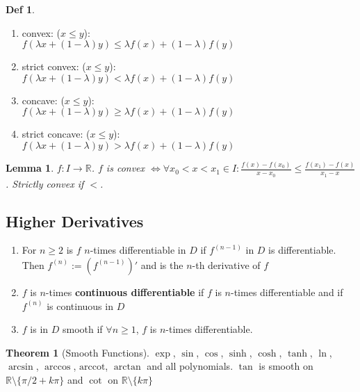 \documentclass[a4paper, 10pt]{article}
\newtheorem*{lemma}{Lemma}
\theoremstyle{definition}
\newtheorem*{definition}{Def}
\theoremstyle{named}
\newtheorem*{ntheorem_wrapper}{Theorem}
\newenvironment{ntheorem}%
    {\begin{mdframed}[style=important]\begin{ntheorem_wrapper}}%
    {\end{ntheorem_wrapper}\end{mdframed}}
\newcommand{\R}{\mathbb{R}}
\begin{document}
\begin{definition}
    \begin{enumerate}
        \item convex: ($x \leq y$): \\
            $f (\lambda x + (1 - \lambda)y) \leq \lambda f(x) + (1 - \lambda)f(y)$
        \item strict convex: ($x \leq y$): \\
            $f (\lambda x + (1 - \lambda)y) < \lambda f(x) + (1 - \lambda)f(y)$
        \item concave: ($x \leq y$): \\
            $f (\lambda x + (1 - \lambda)y) \geq \lambda f(x) + (1 - \lambda)f(y)$
        \item strict concave: ($x \leq y$): \\
        $f (\lambda x + (1 - \lambda)y) > \lambda f(x) + (1 - \lambda)f(y)$
    \end{enumerate}
\end{definition}

\begin{lemma}
    $f: I \to \R$. $f$ is convex $\iff \forall x_0 < x < x_1 \in I: \frac{f(x) - f(x_0)}{x - x_0} \leq \frac{f(x_1) - f(x)}{x_1 - x}$. Strictly convex if $<$.
\end{lemma}

\subsection{Higher Derivatives}
\begin{enumerate}
    \item For $n \geq 2$ is $f$ $n$-times differentiable in $D$ if $f^{(n-1)}$ in $D$ is differentiable. Then $f^{(n)} := (f^{(n-1)})'$ and is the $n$-th derivative of $f$
    \item $f$ is $n$-times \textbf{continuous differentiable} if $f$ is $n$-times differentiable and if $f^{(n)}$ is continuous in $D$
    \item $f$ is in $D$ smooth if $\forall n \geq 1$, $f$ is $n$-times differentiable.
\end{enumerate}

\begin{ntheorem}[Smooth Functions]
    $\exp$, $\sin$, $\cos$, $\sinh$, $\cosh$, $\tanh$, $\ln$, $\arcsin$, $\arccos$, $\text{arccot}$, $\arctan$ and all polynomials. $\tan$ is smooth on $\R \setminus \{\pi / 2 + k \pi\}$ and $\cot$ on $\R \setminus\{k\pi\}$
\end{ntheorem}
\end{document}
